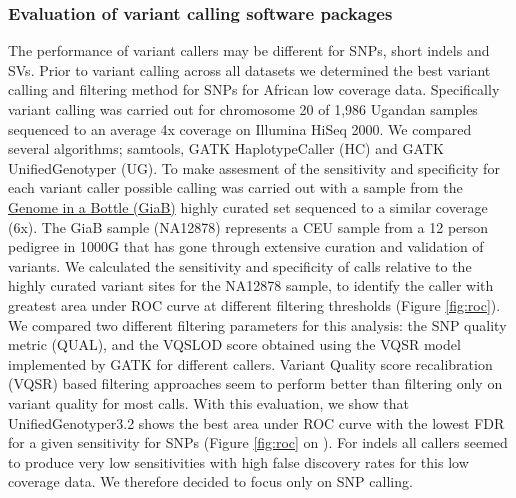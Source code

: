 \subsubsection{Evaluation of variant calling software packages}
The performance of variant callers may be different for SNPs, short indels and SVs. Prior to variant calling across all datasets we determined the best variant calling and filtering method for SNPs for African low coverage data. Specifically variant calling was carried out for chromosome 20 of 1,986 Ugandan samples sequenced to an average 4x coverage on Illumina HiSeq 2000. We compared several algorithms; samtools, GATK HaplotypeCaller (HC) and GATK UnifiedGenotyper (UG). To make assesment of the sensitivity and specificity for each variant caller possible calling was carried out with a sample from the \href{http://genomeinabottle.org}{Genome in a Bottle (GiaB)} highly curated set sequenced to a similar coverage (6x). The GiaB sample (NA12878) represents a CEU sample from a 12 person pedigree in \gls{1000G} that has gone through extensive curation and validation of variants.\cite{Zook2014}
We calculated the sensitivity and specificity of calls relative to the highly curated variant sites for the NA12878 sample, to identify the caller with greatest area under ROC curve at different filtering thresholds (Figure \ref{fig:roc}). We compared two different filtering parameters for this analysis: the SNP quality metric (QUAL), and the VQSLOD score obtained using the VQSR model implemented by GATK for different callers. Variant Quality score recalibration (VQSR) based filtering approaches seem to perform better than filtering only on variant quality for most calls. With this evaluation, we show that UnifiedGenotyper3.2 shows the best area under ROC curve with the lowest FDR for a given sensitivity for SNPs (Figure \ref{fig:roc} on \pageref{fig:roc}). %
For indels all callers seemed to produce very low sensitivities with high false discovery rates for this low coverage data. We therefore decided to focus only on SNP calling.


